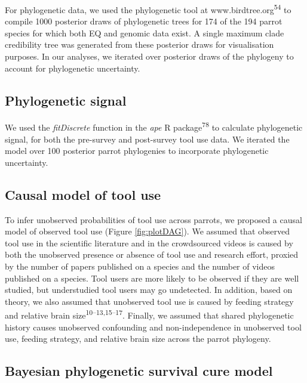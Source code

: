 \documentclass[
  man,floatsintext]{apa6}
\begin{document}
For phylogenetic data, we used the phylogenetic tool at www.birdtree.org\textsuperscript{54} to compile 1000 posterior draws of phylogenetic trees for 174 of the 194 parrot species for which both EQ and genomic data exist. A single maximum clade credibility tree was generated from these posterior draws for visualisation purposes. In our analyses, we iterated over posterior draws of the phylogeny to account for phylogenetic uncertainty.

\hypertarget{phylogenetic-signal}{%
\subsection{Phylogenetic signal}\label{phylogenetic-signal}}

We used the \emph{fitDiscrete} function in the \emph{ape} R package\textsuperscript{78} to calculate phylogenetic signal, for both the pre-survey and post-survey tool use data. We iterated the model over 100 posterior parrot phylogenies to incorporate phylogenetic uncertainty.

\hypertarget{causal-model-of-tool-use}{%
\subsection{Causal model of tool use}\label{causal-model-of-tool-use}}

To infer unobserved probabilities of tool use across parrots, we proposed a causal model of observed tool use (Figure \ref{fig:plotDAG}). We assumed that observed tool use in the scientific literature and in the crowdsourced videos is caused by both the unobserved presence or absence of tool use and research effort, proxied by the number of papers published on a species and the number of videos published on a species. Tool users are more likely to be observed if they are well studied, but understudied tool users may go undetected. In addition, based on theory, we also assumed that unobserved tool use is caused by feeding strategy and relative brain size\textsuperscript{10--13,15--17}. Finally, we assumed that shared phylogenetic history causes unobserved confounding and non-independence in unobserved tool use, feeding strategy, and relative brain size across the parrot phylogeny.

\hypertarget{bayesian-phylogenetic-survival-cure-model}{%
\subsection{Bayesian phylogenetic survival cure model}\label{bayesian-phylogenetic-survival-cure-model}}
\end{document}

